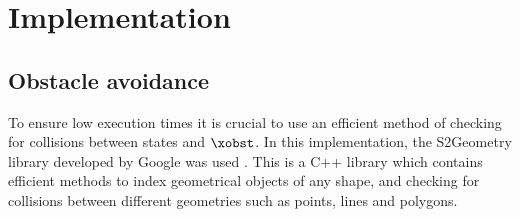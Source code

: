 \chapter{Implementation}\label{cha:implementation}

\section{Obstacle avoidance}
To ensure low execution times it is crucial to use an efficient method of checking for collisions between states and $\xobst$. 
In this implementation, the S2Geometry library developed by Google was used \cite{s2geo}. This is a C++ library which contains 
efficient methods to index geometrical objects of any shape, and checking for collisions between different geometries such as points, lines and polygons. 

